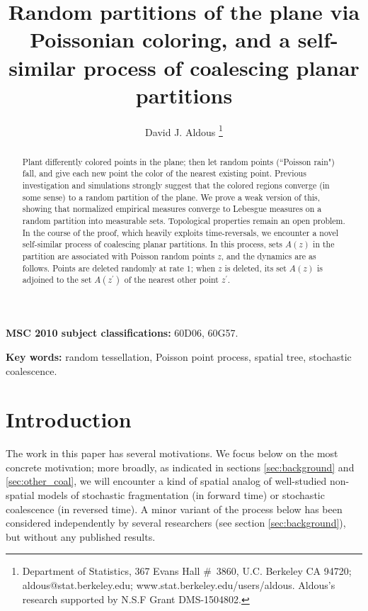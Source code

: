 \documentclass[12pt]{article}
\begin{document}
\title{Random partitions of the plane via Poissonian coloring, 
and a self-similar process of coalescing planar partitions}

 \author{David J. Aldous
 \thanks{Department of Statistics,
 367 Evans Hall \#\  3860,
 U.C. Berkeley CA 94720;  aldous@stat.berkeley.edu;
  www.stat.berkeley.edu/users/aldous.  Aldous's research supported by
 N.S.F Grant DMS-1504802. }}

 \maketitle
 



\begin{abstract}
Plant  differently colored points in the plane; then let random points (``Poisson rain") fall, and give each new point the color of the nearest existing point.
Previous investigation and simulations strongly suggest that the colored regions converge (in some sense) to a random partition of the plane.
We prove a weak version of this, showing that normalized empirical measures converge to Lebesgue measures on a random partition into measurable sets.  
Topological properties  remain an open problem.  In the course of the proof, which heavily exploits  time-reversals, we encounter a novel self-similar process of coalescing planar partitions.  
In this process, sets $A(z)$ in the partition are associated with Poisson random points $z$, and the dynamics are as follows.
 Points are  deleted randomly at rate $1$; when $z$ is deleted, its set $A(z)$ is adjoined to the set $A(z^\prime)$ of the nearest other point $z^\prime$.
 \end{abstract}

{\bf MSC 2010 subject classifications:} 60D06, 60G57.

{\bf Key words:} random tessellation, Poisson point process, spatial tree, stochastic coalescence.

\section{Introduction}
\label{sec:int}
The work in this paper has  several motivations. 
We focus below on the most concrete motivation; more broadly, as indicated in 
sections \ref{sec:background}  and \ref{sec:other_coal}, 
we will encounter a kind of spatial analog of well-studied non-spatial models of stochastic fragmentation (in forward time) or stochastic coalescence (in reversed time).
A minor variant of the process below has been considered independently by several researchers 
(see section \ref{sec:background}), but without any published results. 
\end{document}

